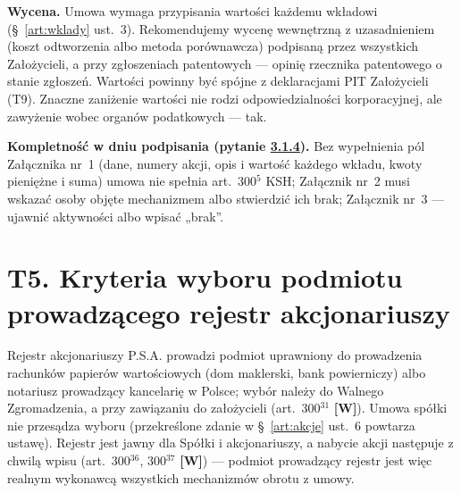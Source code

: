 \documentclass[12pt,a4paper]{report}
\newcommand{\Wiar}[1]{\textbf{[#1]}}
\begin{document}
\textbf{Wycena.} Umowa wymaga przypisania wartości każdemu wkładowi (§~\ref{art:wklady} ust.~3). Rekomendujemy wycenę wewnętrzną z uzasadnieniem (koszt odtworzenia albo metoda porównawcza) podpisaną przez wszystkich Założycieli, a przy zgłoszeniach patentowych --- opinię rzecznika patentowego o stanie zgłoszeń. Wartości powinny być spójne z deklaracjami PIT Założycieli (T9). Znaczne zaniżenie wartości nie rodzi odpowiedzialności korporacyjnej, ale zawyżenie wobec organów podatkowych --- tak.

\textbf{Kompletność w dniu podpisania (pytanie \hyperref[memo:3.1.4]{3.1.4}).} Bez wypełnienia pól Załącznika nr~1 (dane, numery akcji, opis i wartość każdego wkładu, kwoty pieniężne i suma) umowa nie spełnia art.~300$^{5}$ KSH; Załącznik nr~2 musi wskazać osoby objęte mechanizmem albo stwierdzić ich brak; Załącznik nr~3 --- ujawnić aktywności albo wpisać „brak”.

\section*{T5. Kryteria wyboru podmiotu prowadzącego rejestr akcjonariuszy}

Rejestr akcjonariuszy P.S.A. prowadzi podmiot uprawniony do prowadzenia rachunków papierów wartościowych (dom maklerski, bank powierniczy) albo notariusz prowadzący kancelarię w Polsce; wybór należy do Walnego Zgromadzenia, a przy zawiązaniu do założycieli (art.~300$^{31}$ \Wiar{W}). Umowa spółki nie przesądza wyboru (przekreślone zdanie w §~\ref{art:akcje} ust.~6 powtarza ustawę). Rejestr jest jawny dla Spółki i akcjonariuszy, a nabycie akcji następuje z chwilą wpisu (art.~300$^{36}$, 300$^{37}$ \Wiar{W}) --- podmiot prowadzący rejestr jest więc realnym wykonawcą wszystkich mechanizmów obrotu z umowy.
\end{document}
